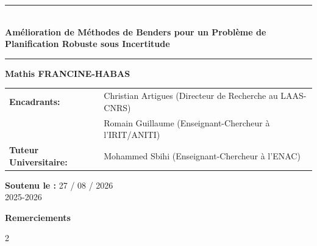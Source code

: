 \documentclass[12pt, a4paper, twoside]{report}
\numberwithin{equation}{section}
\begin{document}
\begin{titlepage}
		\vspace{2.5cm}
		
		\begin{center}
			{\color{mainblue}\rule{\textwidth}{2pt}} \\[0.6cm]
			{\sffamily \Huge \bfseries Amélioration de Méthodes de Benders pour un Problème de Planification Robuste sous Incertitude} \\[0.4cm] 
			{\color{mainblue}\rule{\textwidth}{2pt}}
		\end{center}
		
		\vspace{1.5cm}
		
		\begin{center}
			{\Large \textbf{Mathis FRANCINE-HABAS}} \\[1cm]
			
			\begin{tabular}{ll}
				\textbf{Encadrants:} & Christian Artigues \hfill (Directeur de Recherche au LAAS-CNRS) \\
				& Romain Guillaume \hfill (Enseignant-Chercheur à l'IRIT/ANITI) \\[0.3cm]
				\textbf{Tuteur Universitaire:} & Mohammed Sbihi \hfill (Enseignant-Chercheur à l’ENAC)
			\end{tabular}
		\end{center}
		
		\vfill
		
		\begin{center}
			{\large \textbf{Soutenu le :} 27 / 08 / 2026} \\
			\vspace{0.2cm}
			{\large 2025-2026}
		\end{center}
	\end{titlepage}
	
	\clearpage
	\thispagestyle{empty}
	
	\vspace*{\fill}
	
	\begin{center}
		{\sffamily \Huge \bfseries \textcolor{mainblue}{Remerciements}} \\[1.5cm]
	\end{center}
	
	\begin{spacing}{2}
		
		
	\end{spacing}
	
\end{document}

